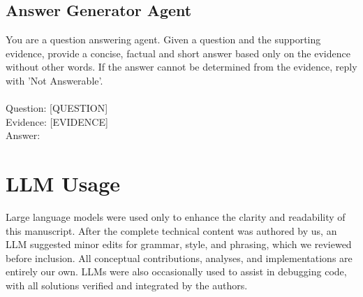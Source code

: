 \documentclass{article} %
\begin{document}
\subsection{Answer Generator Agent}

\begin{tcolorbox}[colback=gray!5,colframe=black!40,title=Answer Generator Prompt Template, fontupper=\footnotesize]

You are a question answering agent. Given a question and the supporting evidence, provide a concise, factual and short answer based only on the evidence without other words. If the answer cannot be determined from the evidence, reply with 'Not Answerable'.
\\ 
\\ 
Question: [QUESTION] \\
Evidence: [EVIDENCE] \\
Answer:

\end{tcolorbox}

\section{LLM Usage}
Large language models were used only to enhance the clarity and readability of this manuscript. After the complete technical content was authored by us, an LLM suggested minor edits for grammar, style, and phrasing, which we reviewed before inclusion. All conceptual contributions, analyses, and implementations are entirely our own. LLMs were also occasionally used to assist in debugging code, with all solutions verified and integrated by the authors.




\end{document}
